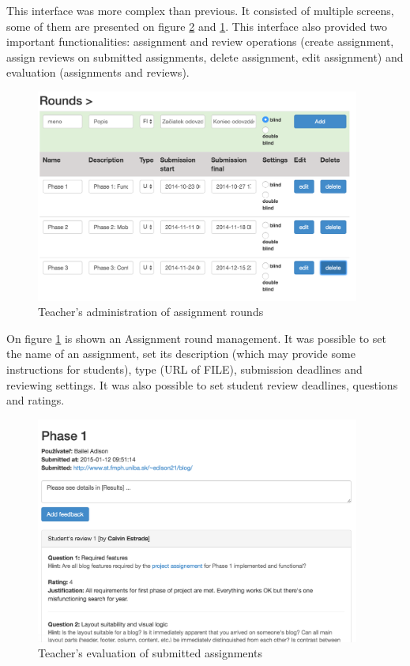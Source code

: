 This interface was more complex than previous. It consisted of multiple screens, some of them are presented on figure \ref{teachereval} and \ref{teacherrounds}. This interface also provided two important functionalities: assignment and review operations (create assignment, assign reviews on submitted assignments, delete assignment, edit assignment) and evaluation (assignments and reviews).



\begin{figure}[h]
    \centering
    \includegraphics[width=0.95\textwidth]{images/teacherrounds.png}
    \caption{Teacher's administration of assignment rounds}
    \label{teacherrounds}
\end{figure}


On figure \ref{teacherrounds} is shown an Assignment round management. It was possible to set the name of an assignment, set its description (which may provide some instructions for students), type (URL of FILE), submission deadlines and reviewing settings. It was also possible to set student review deadlines, questions and ratings.

\begin{figure}[h]
    \centering
    \includegraphics[width=0.95\textwidth]{images/teachereval.png}
    \caption{Teacher's evaluation of submitted assignments}
    \label{teachereval}
\end{figure}


